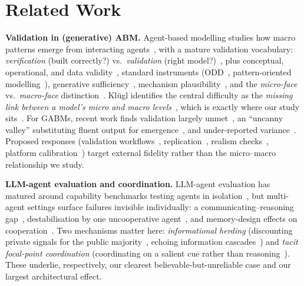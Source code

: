 \documentclass[runningheads]{llncs}
\begin{document}
\section{Related Work}\label{sec:related}
\textbf{Validation in (generative) ABM.} Agent-based modelling studies how macro patterns emerge from interacting agents~\cite{epstein1996growing}, with a mature validation vocabulary: \emph{verification} (built correctly?) vs.\ \emph{validation} (right model?)~\cite{sargent2010verification,rand2011rigor}, plus conceptual, operational, and data validity~\cite{sargent2010verification,augusiak2014evaludation}, standard instruments (ODD~\cite{grimm2006odd,grimm2020odd}, pattern-oriented modelling~\cite{grimm2005pom}), generative sufficiency~\cite{moss2005towards}, mechanism plausibility~\cite{zhao2026mechanism}, and the \emph{micro-face} vs.\ \emph{macro-face} distinction~\cite{windrum2007empirical}. Kl\"ugl identifies the central difficulty as the \emph{missing link between a model's micro and macro levels}~\cite{kluegl2008validation}, which is exactly where our study sits~\cite{augusiak2014evaludation}. For GABMs, recent work finds validation largely unmet~\cite{larooij2025critical}, an ``uncanny valley'' substituting fluent output for emergence~\cite{zeng2026uncanny}, and under-reported variance~\cite{wu2026boundary}. Proposed responses (validation workflows~\cite{adornetto2025overview}, replication~\cite{cross2025validating}, realism checks~\cite{munker2026benchmark}, platform calibration~\cite{tomasevic2026operational}) target external fidelity rather than the micro--macro relationship we study.

\textbf{LLM-agent evaluation and coordination.} LLM-agent evaluation has matured around capability benchmarks testing agents in isolation~\cite{li2024agentbench,mohammadi2025evaluation}, but multi-agent settings surface failures invisible individually: a communicating--reasoning gap~\cite{zhang2026silo}, destabilisation by one uncooperative agent~\cite{kulshreshtha2026defection}, and memory-design effects on cooperation~\cite{hishiki2026memory}. Two mechanisms matter here: \emph{informational herding} (discounting private signals for the public majority~\cite{cho2025herd,jain2025social,zhong2025conformity}, echoing information cascades~\cite{bikhchandani1992theory}) and \emph{tacit focal-point coordination} (coordinating on a salient cue rather than reasoning~\cite{aharon2026tacit}). These underlie, respectively, our clearest believable-but-unreliable case and our largest architectural effect.
\end{document}
